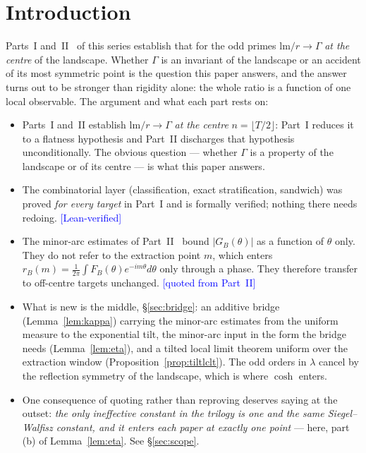 \documentclass[11pt,a4paper]{article}
\theoremstyle{plain}
\theoremstyle{definition}
\theoremstyle{remark}
\newcommand{\lm}{\mathrm{lm}}
\newcommand{\STATUS}[1]{\textcolor{blue}{\textsf{[#1]}}}
\begin{document}
\section{Introduction}\label{sec:intro}

Parts~I and~II~\cite{P1,P2} of this series establish that for the odd primes
$\lm/r\to\Gamma$ \emph{at the centre} of the landscape. Whether $\Gamma$ is an invariant of
the landscape or an accident of its most symmetric point is the question this paper answers,
and the answer turns out to be stronger than rigidity alone: the whole ratio is a function of
one local observable. The argument and what each part rests on:

\begin{itemize}
\item Parts~I and~II establish $\lm/r\to\Gamma$ \emph{at the centre}
      $n=\lfloor T/2\rfloor$: Part~I reduces it to a flatness hypothesis and Part~II
      discharges that hypothesis unconditionally. The obvious question --- whether $\Gamma$ is
      a property of the landscape or of its centre --- is what this paper answers.
\item The combinatorial layer (classification, exact stratification, sandwich) was proved
      \emph{for every target} in Part~I and is formally verified; nothing there needs redoing.
      \STATUS{Lean-verified}
\item The minor-arc estimates of Part~II~\cite{P2} bound $|G_B(\theta)|$ as a function of $\theta$ only.
      They do not refer to the extraction point $m$, which enters
      $r_B(m)=\frac1{2\pi}\int F_B(\theta)e^{-im\theta}d\theta$ only through a phase. They
      therefore transfer to off-centre targets unchanged. \STATUS{quoted from Part~II}
\item What is new is the middle, \S\ref{sec:bridge}: an additive bridge
      (Lemma~\ref{lem:kappa}) carrying the minor-arc estimates from the uniform measure to the
      exponential tilt, the minor-arc input in the form the bridge needs
      (Lemma~\ref{lem:eta}), and a tilted local limit theorem uniform over the extraction
      window (Proposition~\ref{prop:tiltlclt}). The odd orders in $\lambda$ cancel by the
      reflection symmetry of the landscape, which is where $\cosh$ enters.
\item One consequence of quoting rather than reproving deserves saying at the outset: \emph{the
      only ineffective constant in the trilogy is one and the same Siegel--Walfisz constant,
      and it enters each paper at exactly one point} --- here, part (b) of
      Lemma~\ref{lem:eta}. See \S\ref{sec:scope}.
\end{itemize}
\end{document}
